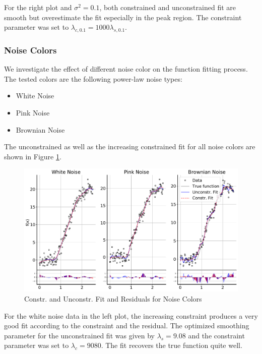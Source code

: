 \documentclass[10pt,a4paper]{article}
\begin{document}
For the right plot and $\sigma^2=0.1$, both constrained and unconstrained fit are smooth but overestimate the fit especially in the peak region. The constraint parameter was set to $\lambda_{c, 0.1} = 1000\lambda_{s, 0.1}$. 

\subsubsection{Noise Colors}

We investigate the effect of different noise color on the function fitting process. The tested colors are the following power-law noise types:

\begin{itemize}
	\item  White Noise
	\item Pink Noise
	\item Brownian Noise
\end{itemize}

The unconstrained as well as the increasing constrained fit for all noise colors are shown in Figure \ref{fig:fit_noise_colors}.

\begin{figure}[H]
	\centering
	\includegraphics[width=\columnwidth]{../thesisplots/exp_noise_colors.pdf}
	\caption{Constr. and Unconstr. Fit and Residuals for Noise Colors}
	\label{fig:fit_noise_colors}
\end{figure}

For the white noise data in the left plot, the increasing constraint produces a very good fit according to the constraint and the residual. The optimized smoothing parameter for the unconstrained fit was given by $\lambda_s = 9.08$ and the constraint parameter was set to $\lambda_c = 9080$. The fit recovers the true function quite well. 
\end{document}
